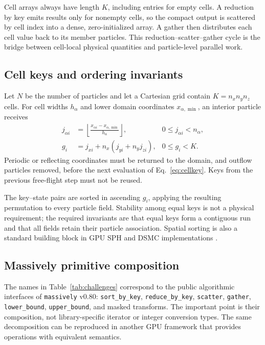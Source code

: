 \documentclass[a4paper,11pt]{article}
\newcommand{\massively}{\texttt{massively}\xspace}
\begin{document}
Cell arrays always have length $K$, including entries for empty cells.  A
reduction by key emits results only for nonempty cells, so the compact output
is scattered by cell index into a dense, zero-initialized array.  A gather then
distributes each cell value back to its member particles.  This
reduction--scatter--gather cycle is the bridge between cell-local physical
quantities and particle-level parallel work.

\subsection{Cell keys and ordering invariants}

Let $N$ be the number of particles and let a Cartesian grid contain
$K=n_xn_yn_z$ cells.  For cell widths $h_\alpha$ and lower domain coordinates
$x_{\alpha,\min}$, an interior particle receives
\begin{align}
 j_{\alpha i}&=\left\lfloor
 \frac{x_{\alpha i}-x_{\alpha,\min}}{h_\alpha}\right\rfloor,
 & 0\leq j_{\alpha i}<n_\alpha,\\
 g_i&=j_{xi}+n_x\left(j_{yi}+n_yj_{zi}\right),
 &0\leq g_i<K.
 \label{eq:cellkey}
\end{align}
Periodic or reflecting coordinates must be returned to the domain, and outflow
particles removed, before the next evaluation of Eq.~\eqref{eq:cellkey}.
Keys from the previous free-flight step must not be reused.

The key--state pairs are sorted in ascending $g_i$, applying the resulting
permutation to every particle field.  Stability among equal keys is not a
physical requirement; the required invariants are that equal keys form a
contiguous run and that all fields retain their particle association.  Spatial
sorting is also a standard building block in GPU SPH and DSMC implementations
\cite{crespo2011,su2012}.

\subsection{Massively primitive composition}

The names in Table~\ref{tab:challenges} correspond to the public algorithmic
interfaces of \massively v0.80: \texttt{sort\_by\_key},
\texttt{reduce\_by\_key}, \texttt{scatter}, \texttt{gather},
\texttt{lower\_bound}, \texttt{upper\_bound}, and masked transforms.  The
important point is their composition, not library-specific iterator or integer
conversion types.  The same decomposition can be reproduced in another GPU
framework that provides operations with equivalent semantics.
\end{document}
